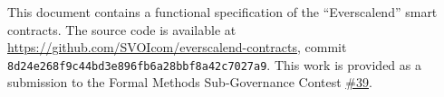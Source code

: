 

This document contains a functional specification of the ``Everscalend'' smart contracts. The source code is available at \\\url{https://github.com/SVOIcom/everscalend-contracts}, commit \\\verb+8d24e268f9c44bd3e896fb6a28bbf8a42c7027a9+. This work is provided as a submission to the Formal Methods Sub-Governance Contest \href{https://formet.gov.freeton.org/proposal?proposalAddress=0\%3A222afd84a41bb8c70517d692d0a4a28c42898b1d3520279a86878202f5730a0f}{\#39}.





